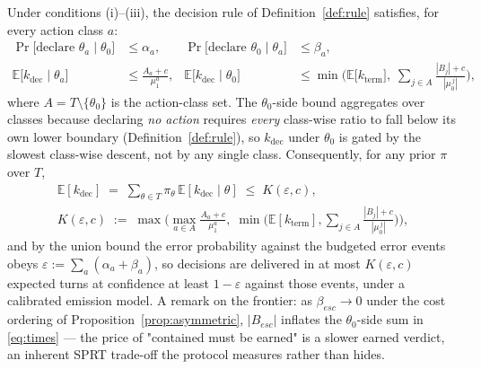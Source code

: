 \begin{theorem}
\label{thm:stopping}
Under conditions (i)--(iii), the decision rule of Definition~\ref{def:rule} satisfies, for every action class $a$:
\begin{align}
  \Pr\bigl[\text{declare } \theta_a \mid \theta_0\bigr] &\leq \alpha_a,
  &
  \Pr\bigl[\text{declare } \theta_0 \mid \theta_a\bigr] &\leq \beta_a,
  \label{eq:errors}\\
  \mathbb{E}\bigl[k_{\mathrm{dec}} \mid \theta_a\bigr]
    &\leq \frac{A_a + c}{\mu_1^{a}},
  &
  \mathbb{E}\bigl[k_{\mathrm{dec}} \mid \theta_0\bigr]
    &\leq \min\Biggl(\mathbb{E}\bigl[k_{\mathrm{term}}\bigr],\;
      \sum_{j \in A} \frac{|B_j| + c}{|\mu_0^{\,j}|}\Biggr),
  \label{eq:times}
\end{align}
where $A = T \setminus \{\theta_0\}$ is the action-class set.
The $\theta_0$-side bound aggregates over classes because declaring \emph{no action} requires
\emph{every} class-wise ratio to fall below its own lower boundary (Definition~\ref{def:rule}),
so $k_{\mathrm{dec}}$ under $\theta_0$ is gated by the slowest class-wise descent, not by any
single class.
Consequently, for any prior $\pi$ over $T$,
\begin{align}
  \label{eq:unconditional}
  \mathbb{E}[k_{\mathrm{dec}}] \;=\; \textstyle\sum_{\theta \in T} \pi_\theta\, \mathbb{E}[k_{\mathrm{dec}} \mid \theta] \;\leq\; K(\varepsilon, c),
\\[2pt]
  K(\varepsilon, c) \;:=\; \max\Biggl(\max_{a \in A} \tfrac{A_a + c}{\mu_1^{a}},\;
  \min\bigl(\mathbb{E}[k_{\mathrm{term}}], \textstyle\sum_{j \in A} \tfrac{|B_j| + c}{|\mu_0^{\,j}|}\bigr)\Biggr),
\end{align}
and by the union bound the error probability against the budgeted error events obeys
$\varepsilon := \sum_{a} (\alpha_a + \beta_a)$, so decisions are delivered in at most
$K(\varepsilon, c)$ expected turns at confidence at least $1 - \varepsilon$ against those events,
under a calibrated emission model.
A remark on the frontier: as $\beta_{esc} \to 0$ under the cost ordering of Proposition~\ref{prop:asymmetric}, $|B_{esc}|$ inflates the $\theta_0$-side sum in \eqref{eq:times} --- the price of "contained must be earned" is a slower earned verdict, an inherent SPRT trade-off the protocol measures rather than hides.
\end{theorem}

